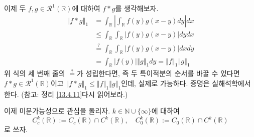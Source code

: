 \documentclass[11pt]{book}
\numberwithin{equation}{chapter}
\def\NN{\mathbb{N}}
\def\RR{\mathbb{R}}
\def\calR{\mathcal{R}}
\newcommand{\abs}[1]{\left\vert#1\right\vert}
\newcommand{\norm}[1]{\left\Vert#1\right\Vert}
\theoremstyle{definition}
\begin{document}
이제 두 \(f, g \in \calR^1(\RR)\)에 대하여 \(f * g\)를 생각해보자.
\begin{align*}
    \norm{f*g}_1 &= \int_{\RR} \abs{\int_{\RR} f(y) g(x - y) dy}dx\\
    &\le \int_{\RR} \int_{\RR} \abs{f(y) g(x - y)} dy dx\\
    &\stackrel{?}{=} \int_{\RR} \int_{\RR} \abs{f(y) g(x - y)} dxdy\\
    &= \int_{\RR} \abs{f(y)} \norm{g}_1 dy = \norm{f}_1 \norm{g}_1
\end{align*}
위 식의 세 번째 줄의 \(\stackrel{?}{=}\)가 성립한다면, 즉 두 특이적분의 순서를 바꿀 수 있다면 \(f * g \in \calR^1(\RR)\)이고 \(\norm{f*g}_1 \le \norm{f}_1 \norm{g}_1\)인데, 실제로 가능하다. 증명은 실해석학에서 한다. (참고: 정리 \ref{13.4.11}\을 다시 읽어보라.)

이제 미분가능성으로 관심을 돌리자. \(k \in \NN \cup \{\infty\}\)에 대하여
\[
C_c^k(\RR) := C_c(\RR) \cap C^k(\RR), \quad C_0^k(\RR) := C_0(\RR) \cap C^k(\RR)
\]
로 쓰자.
\end{document}
